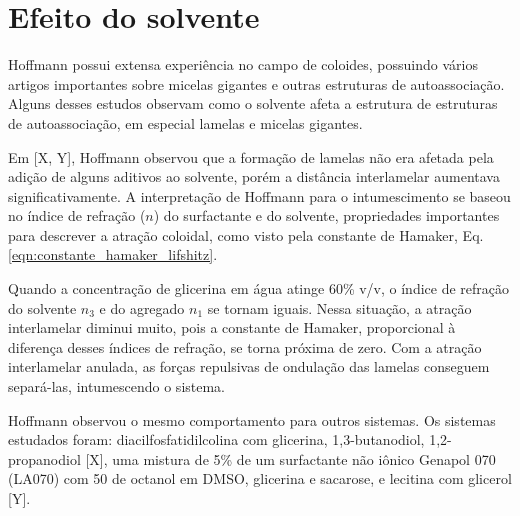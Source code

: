 
		
		\section{Efeito do solvente} 
		\label{sec:efeito_solvente}
		
		Hoffmann possui extensa experiência no campo de coloides, possuindo vários artigos importantes sobre micelas gigantes e outras estruturas de autoassociação. Alguns desses estudos observam como o solvente afeta a estrutura de estruturas de autoassociação, em especial lamelas e micelas gigantes.

		Em [X, Y], Hoffmann observou que a formação de lamelas não era afetada pela adição de alguns aditivos ao solvente, porém a distância interlamelar aumentava significativamente. A interpretação de Hoffmann para o intumescimento se baseou no índice de refração (\(n\)) do surfactante e do solvente, propriedades importantes para descrever a atração coloidal, como visto pela constante de Hamaker, Eq. \ref{eqn:constante_hamaker_lifshitz}.
		
		Quando a concentração de glicerina em água atinge 60\% v/v, o índice de refração do solvente \(n_3\) e do agregado \(n_1\) se tornam iguais. Nessa situação, a atração interlamelar diminui muito, pois a constante de Hamaker, proporcional à diferença desses índices de refração, se torna próxima de zero. Com a atração interlamelar anulada, as forças repulsivas de ondulação das lamelas conseguem separá-las, intumescendo o sistema.
		
		Hoffmann observou o mesmo comportamento para outros sistemas. Os sistemas estudados foram: diacilfosfatidilcolina com glicerina, 1,3-butanodiol, 1,2-propanodiol [X], uma mistura de 5\% de um surfactante não iônico Genapol 070 (LA070) com 50\mM{} de octanol em DMSO, glicerina e sacarose, e lecitina com glicerol [Y].
		
		
